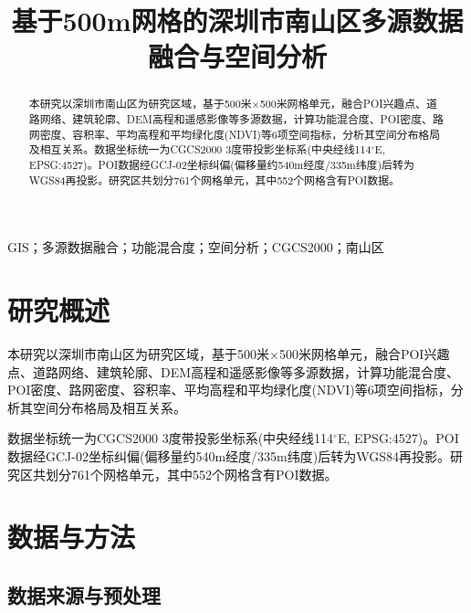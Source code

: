 \documentclass[conference]{IEEEtran}
\begin{document}
\title{基于500m网格的深圳市南山区多源数据融合与空间分析}

\author{
}

\maketitle

\begin{abstract}
本研究以深圳市南山区为研究区域，基于500米$\times$500米网格单元，融合POI兴趣点、道路网络、建筑轮廓、DEM高程和遥感影像等多源数据，计算功能混合度、POI密度、路网密度、容积率、平均高程和平均绿化度(NDVI)等6项空间指标，分析其空间分布格局及相互关系。数据坐标统一为CGCS2000 3度带投影坐标系(中央经线114$^\circ$E, EPSG:4527)。POI数据经GCJ-02坐标纠偏(偏移量约540m经度/335m纬度)后转为WGS84再投影。研究区共划分761个网格单元，其中552个网格含有POI数据。
\end{abstract}

\begin{IEEEkeywords}
GIS；多源数据融合；功能混合度；空间分析；CGCS2000；南山区
\end{IEEEkeywords}

\section{研究概述}

本研究以深圳市南山区为研究区域，基于500米$\times$500米网格单元，融合POI兴趣点、道路网络、建筑轮廓、DEM高程和遥感影像等多源数据，计算功能混合度、POI密度、路网密度、容积率、平均高程和平均绿化度(NDVI)等6项空间指标，分析其空间分布格局及相互关系。

数据坐标统一为CGCS2000 3度带投影坐标系(中央经线114$^\circ$E, EPSG:4527)。POI数据经GCJ-02坐标纠偏(偏移量约540m经度/335m纬度)后转为WGS84再投影。研究区共划分761个网格单元，其中552个网格含有POI数据。

\section{数据与方法}

\subsection{数据来源与预处理}
\end{document}

